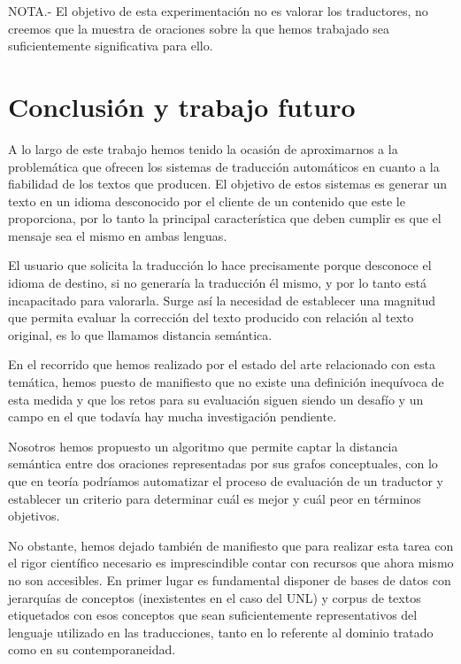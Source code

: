 \documentclass[a4paper,12pt,spanish]{book}
\begin{document}
NOTA.- El objetivo de esta experimentación no es valorar los traductores, no creemos
que la muestra de oraciones sobre la que hemos trabajado sea suficientemente
significativa para ello.
\newpage

\chapter{Conclusión y trabajo futuro}
\label{6.conclusion/index:conclusion-y-trabajo-futuro}\label{6.conclusion/index::doc}
A lo largo de este trabajo hemos tenido la ocasión de aproximarnos a la problemática que
ofrecen los sistemas de traducción automáticos en cuanto a la fiabilidad de los textos
que producen. El objetivo de estos sistemas es generar un texto en un idioma desconocido
por el cliente de un contenido que este le proporciona, por lo tanto la principal
característica que deben cumplir es que el mensaje sea el mismo en ambas lenguas.

El usuario que solicita la traducción lo hace precisamente porque desconoce el idioma de
destino, si no generaría la traducción él mismo, y por lo tanto está incapacitado para
valorarla. Surge así la necesidad de establecer una magnitud que permita evaluar la
corrección del texto producido con relación al texto original, es lo que llamamos
distancia semántica.

En el recorrido que hemos realizado por el estado del arte relacionado con esta temática,
hemos puesto de manifiesto que no existe una definición inequívoca de esta medida y que
los retos para su evaluación siguen siendo un desafío y un campo en el que todavía
hay mucha investigación pendiente.

Nosotros hemos propuesto un algoritmo que permite captar la distancia semántica entre dos
oraciones representadas por sus grafos conceptuales, con lo que en teoría podríamos
automatizar el proceso de evaluación de un traductor y establecer un criterio para
determinar cuál es mejor y cuál peor en términos objetivos.

No obstante, hemos dejado también de manifiesto que para realizar esta tarea con el
rigor científico necesario es imprescindible contar con recursos que ahora mismo no son
accesibles. En primer lugar es fundamental disponer de bases de datos con jerarquías de
conceptos (inexistentes en el caso del UNL) y corpus de textos etiquetados con esos
conceptos que sean suficientemente representativos del lenguaje utilizado en las
traducciones, tanto en lo referente al dominio tratado como en su contemporaneidad.
\end{document}
